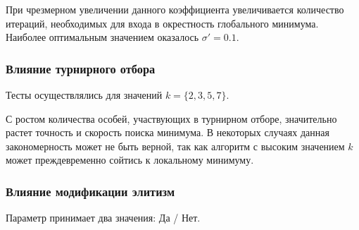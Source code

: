 \documentclass[12pt,a4paper]{article}
\begin{document}
При чрезмерном увеличении данного коэффициента увеличивается количество итераций, необходимых для входа в окрестность глобального минимума. Наиболее оптимальным значением оказалось \(\sigma' = 0.1\).

\subsubsection{Влияние турнирного отбора}
Тесты осуществлялись для значений \(k = \{2, 3, 5, 7\}\).

\begin{table}[H]
    \centering
    \caption{Исследование влияния турнирного отбора.}
    \label{tab:tournament}
\end{table}

С ростом количества особей, участвующих в турнирном отборе, значительно растет точность и скорость поиска минимума. В некоторых случаях данная закономерность может не быть верной, так как алгоритм с высоким значением \(k\) может преждевременно сойтись к локальному минимуму.

\subsubsection{Влияние модификации элитизм}
Параметр принимает два значения: Да / Нет.
\end{document}
